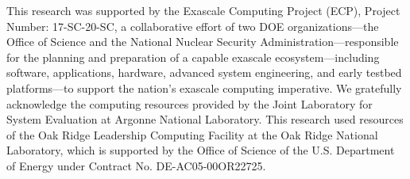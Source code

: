 \documentclass{ecpreportv2}
\begin{document}
This research was supported by the Exascale Computing Project (ECP), Project
Number: 17-SC-20-SC, a collaborative effort of two DOE organizations---the
Office of Science and the National Nuclear Security Administration---responsible
for the planning and preparation of a capable exascale ecosystem---including
software, applications, hardware, advanced system engineering, and early testbed
platforms---to support the nation's exascale computing imperative. We gratefully
acknowledge the computing resources provided by the Joint Laboratory for System
Evaluation at Argonne National Laboratory. This research used resources of the
Oak Ridge Leadership Computing Facility at the Oak Ridge National Laboratory,
which is supported by the Office of Science of the U.S. Department of Energy
under Contract No. DE-AC05-00OR22725.






\end{document}
